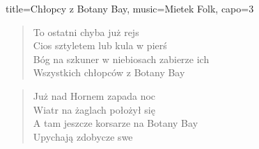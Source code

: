 \begin{song}{title={Chłopcy z Botany Bay}, music={Mietek Folk}, capo=3}
\begin{multicols}{2}
\begin{verse}
    \end{verse}
    \begin{verse}
        To ostatni chyba już rejs \\
        Cios sztyletem lub kula w pierś \\
        Bóg na szkuner w niebiosach zabierze ich \\
        Wszystkich chłopców z Botany Bay
    \end{verse}
    \begin{verse}
        Już nad Hornem zapada noc \\
        Wiatr na żaglach położył się \\
        A tam jeszcze korsarze na Botany Bay \\
        Upychają zdobycze swe
    \end{verse}
\end{multicols}
\end{song}


